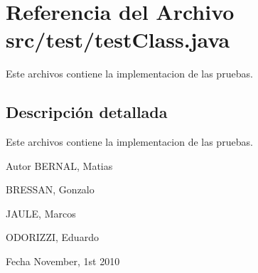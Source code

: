 \section{Referencia del Archivo src/test/testClass.java}
\label{test_class_8java}


Este archivos contiene la implementacion de las pruebas.  




\subsection{Descripción detallada}
Este archivos contiene la implementacion de las pruebas. \begin{DoxyAuthor}{Autor}
BERNAL, Matias\par
 BRESSAN, Gonzalo\par
 JAULE, Marcos\par
 ODORIZZI, Eduardo
\end{DoxyAuthor}
\begin{DoxyDate}{Fecha}
November, 1st 2010 
\end{DoxyDate}
